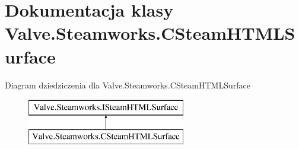 \hypertarget{class_valve_1_1_steamworks_1_1_c_steam_h_t_m_l_surface}{}\section{Dokumentacja klasy Valve.\+Steamworks.\+C\+Steam\+H\+T\+M\+L\+Surface}
\label{class_valve_1_1_steamworks_1_1_c_steam_h_t_m_l_surface}
Diagram dziedziczenia dla Valve.\+Steamworks.\+C\+Steam\+H\+T\+M\+L\+Surface\begin{figure}[H]
\begin{center}
\leavevmode
\includegraphics[height=2.000000cm]{class_valve_1_1_steamworks_1_1_c_steam_h_t_m_l_surface}
\end{center}
\end{figure}
